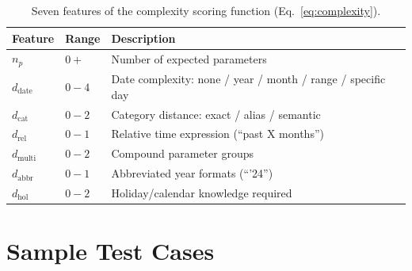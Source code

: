 \documentclass[11pt,twocolumn]{article}
\begin{document}
\begin{table}[h]
\centering
\small
\begin{tabular}{@{}llp{4.5cm}@{}}
\toprule
\textbf{Feature} & \textbf{Range} & \textbf{Description} \\
\midrule
$n_p$              & $0{+}$    & Number of expected parameters \\
$d_{\text{date}}$  & $0{-}4$   & Date complexity: none / year / month / range / specific day \\
$d_{\text{cat}}$   & $0{-}2$   & Category distance: exact / alias / semantic \\
$d_{\text{rel}}$   & $0{-}1$   & Relative time expression (``past X months'') \\
$d_{\text{multi}}$ & $0{-}2$   & Compound parameter groups \\
$d_{\text{abbr}}$  & $0{-}1$   & Abbreviated year formats (``'24'') \\
$d_{\text{hol}}$   & $0{-}2$   & Holiday/calendar knowledge required \\
\bottomrule
\end{tabular}
\caption{Seven features of the complexity scoring function (Eq.~\ref{eq:complexity}).}
\label{tab:complexity_features}
\end{table}

\section{Sample Test Cases}
\label{sec:sample_tc}

\begin{table}[!ht]
\centering
\small
{}
\caption{Sample test cases. Note informal language, abbreviations, and semantic mappings (``metro''$\to$``tokyo metro'', ``groceries''$\to$``grocery'').}
\label{tab:sample_tc}
\end{table}
\end{document}
